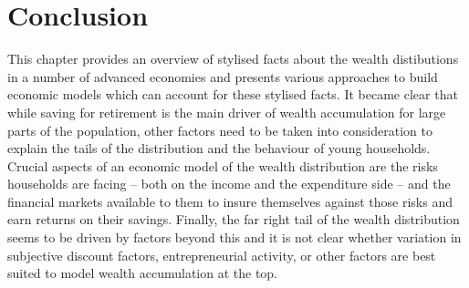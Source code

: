 \section{Conclusion}
This chapter provides an overview of stylised facts about the wealth distibutions
in a number of advanced economies and presents various approaches to build economic
models which can account for these stylised facts.
It became clear that while saving for retirement is the main driver of wealth
accumulation for large parts of the population, other factors need to be taken
into consideration to explain the tails of the distribution and the behaviour of
young households. Crucial aspects of an economic model of the wealth distribution
are the risks households are facing -- both on the income and the expenditure side
-- and the financial markets available to them to insure themselves against those
risks and earn returns on their savings. Finally, the far right tail of the wealth
distribution seems to be driven by factors beyond this and it is not clear whether
variation in subjective discount factors, entrepreneurial activity, or other
factors are best suited to model wealth accumulation at the top.
